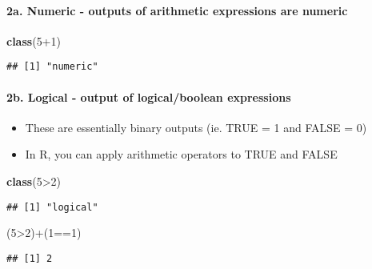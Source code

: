 \documentclass[]{article}
\newenvironment{Shaded}{\begin{snugshade}}{\end{snugshade}}
\newcommand{\KeywordTok}[1]{\textcolor[rgb]{0.13,0.29,0.53}{\textbf{{#1}}}}
\newcommand{\DecValTok}[1]{\textcolor[rgb]{0.00,0.00,0.81}{{#1}}}
\newcommand{\NormalTok}[1]{{#1}}
\providecommand{\tightlist}{%
  \setlength{\itemsep}{0pt}\setlength{\parskip}{0pt}}
\let\oldparagraph\paragraph
\renewcommand{\paragraph}[1]{\oldparagraph{#1}\mbox{}}
\begin{document}
\paragraph{2a. Numeric - outputs of arithmetic expressions are
numeric}\label{a.-numeric---outputs-of-arithmetic-expressions-are-numeric}

\begin{Shaded}
\begin{Highlighting}[]
\KeywordTok{class}\NormalTok{(}\DecValTok{5+1}\NormalTok{)}
\end{Highlighting}
\end{Shaded}

\begin{verbatim}
## [1] "numeric"
\end{verbatim}

\paragraph{2b. Logical - output of logical/boolean
expressions}\label{b.-logical---output-of-logicalboolean-expressions}

\begin{itemize}
\tightlist
\item
  These are essentially binary outputs (ie. TRUE = 1 and FALSE = 0)
\item
  In R, you can apply arithmetic operators to TRUE and FALSE
\end{itemize}

\begin{Shaded}
\begin{Highlighting}[]
\KeywordTok{class}\NormalTok{(}\DecValTok{5}\NormalTok{>}\DecValTok{2}\NormalTok{)}
\end{Highlighting}
\end{Shaded}

\begin{verbatim}
## [1] "logical"
\end{verbatim}

\begin{Shaded}
\begin{Highlighting}[]
\NormalTok{(}\DecValTok{5}\NormalTok{>}\DecValTok{2}\NormalTok{)+(}\DecValTok{1}\NormalTok{==}\DecValTok{1}\NormalTok{)}
\end{Highlighting}
\end{Shaded}

\begin{verbatim}
## [1] 2
\end{verbatim}
\end{document}
